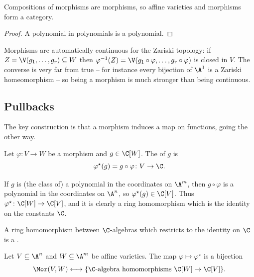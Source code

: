 \begin{proposition}
	Compositions of morphisms are morphisms, so affine varieties and morphisms form a category.
\end{proposition}

\begin{proof}
	A polynomial in polynomials is a polynomial.
\end{proof}

Morphisms are automatically continuous for the Zariski topology: if $Z = \V(g_1,\dots,g_r) \subseteq W$ then $\varphi^{-1}(Z) = \V(g_1 \circ \varphi, \dots, g_r \circ \varphi)$ is closed in $V$. The converse is very far from true -- for instance every bijection of $\A^1$ is a Zariski homeomorphism -- so being a morphism is much stronger than being continuous.

\subsection{Pullbacks}

The key construction is that a morphism induces a map on functions, going the other way.

\begin{definition}[Pullback]
	Let $\varphi \colon V \to W$ be a morphism and $g \in \C[W]$. The  of $g$ is
	$$\varphi^\star(g) = g \circ \varphi \colon V \to \C.$$
\end{definition}

If $g$ is (the class of) a polynomial in the coordinates on $\A^m$, then $g \circ \varphi$ is a polynomial in the coordinates on $\A^n$, so $\varphi^\star(g) \in \C[V]$. Thus $\varphi^\star \colon \C[W] \to \C[V]$, and it is clearly a ring homomorphism which is the identity on the constants $\C$.

\begin{definition}
	A ring homomorphism between $\C$-algebras which restricts to the identity on $\C$ is a .
\end{definition}

\begin{theorem}\label{thm:morequiv}
	Let $V \subseteq \A^n$ and $W \subseteq \A^m$ be affine varieties. The map $\varphi \mapsto \varphi^\star$ is a bijection
	$$\Mor(V,W) \longleftrightarrow \{\C\text{-algebra homomorphisms } \C[W] \to \C[V]\}.$$
\end{theorem}

